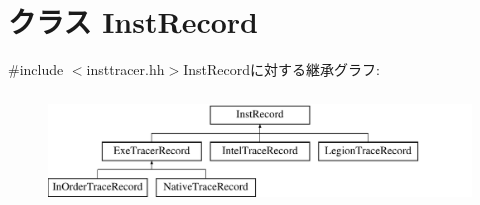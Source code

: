 \hypertarget{classTrace_1_1InstRecord}{
\section{クラス InstRecord}
\label{classTrace_1_1InstRecord}
}


{\ttfamily \#include $<$insttracer.hh$>$}InstRecordに対する継承グラフ:\begin{figure}[H]
\begin{center}
\leavevmode
\includegraphics[height=3cm]{classTrace_1_1InstRecord}
\end{center}
\end{figure}
